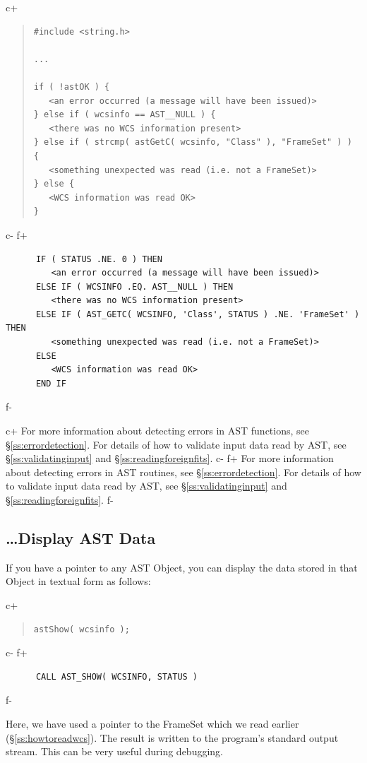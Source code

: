 \documentclass[twoside,11pt]{article}
\newcommand{\secref}[1]{\S\ref{#1}}
\newcommand{\secref}[1]{\ref{#1}}
\begin{document}
c+
\begin{quote}
\small
\begin{verbatim}
#include <string.h>

...

if ( !astOK ) {
   <an error occurred (a message will have been issued)>
} else if ( wcsinfo == AST__NULL ) {
   <there was no WCS information present>
} else if ( strcmp( astGetC( wcsinfo, "Class" ), "FrameSet" ) ) {
   <something unexpected was read (i.e. not a FrameSet)>
} else {
   <WCS information was read OK>
}
\end{verbatim}
\normalsize
\end{quote}
c-
f+
\small
\begin{verbatim}
      IF ( STATUS .NE. 0 ) THEN
         <an error occurred (a message will have been issued)>
      ELSE IF ( WCSINFO .EQ. AST__NULL ) THEN
         <there was no WCS information present>
      ELSE IF ( AST_GETC( WCSINFO, 'Class', STATUS ) .NE. 'FrameSet' ) THEN
         <something unexpected was read (i.e. not a FrameSet)>
      ELSE
         <WCS information was read OK>
      END IF
\end{verbatim}
\normalsize
f-

c+
For more information about detecting errors in AST functions, see
\secref{ss:errordetection}. For details of how to validate input data
read by AST, see \secref{ss:validatinginput} and
\secref{ss:readingforeignfits}.
c-
f+
For more information about detecting errors in AST routines, see
\secref{ss:errordetection}. For details of how to validate input data
read by AST, see \secref{ss:validatinginput} and
\secref{ss:readingforeignfits}.
f-

\subsection{\ldots Display AST Data}

If you have a pointer to any AST Object, you can display the data
stored in that Object in textual form as follows:

c+
\begin{quote}
\small
\begin{verbatim}
astShow( wcsinfo );
\end{verbatim}
\normalsize
\end{quote}
c-
f+
\small
\begin{verbatim}
      CALL AST_SHOW( WCSINFO, STATUS )
\end{verbatim}
\normalsize
f-

Here, we have used a pointer to the FrameSet which we read earlier
(\secref{ss:howtoreadwcs}).  The result is written to the program's
standard output stream. This can be very useful during debugging.
\end{document}
